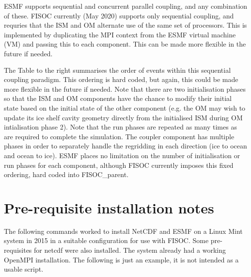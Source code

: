 \documentclass[11pt]{article}
\begin{document}
ESMF supports sequential and concurrent parallel coupling, and any combination of these. 
FISOC currently (May 2020) supports only sequential coupling, and requries that
the ISM and OM alternate use of the same set of processors.
This is implemented by duplicating the MPI context from the ESMF virtual machine (VM)
and passing this to each component. 
This can be made more flexible in the future if needed. 

The Table to the right summarises the order of events within this sequential coupling paradigm.
This ordering is hard coded, but again, this could be made more flexible in the future
if needed.
Note that there are two initialisation phases so that the ISM and OM components have the chance
to modify their initial state based on the initial state of the other component
(e.g. the OM may wish to update its ice shelf cavity geometry directly from the initialised
ISM during OM intialisation phase 2).
Note that the run phases are repeated as many times as are required to complete the simulation.
The coupler component  has multiple phases in order to separately handle
the regridding in each direction (ice to ocean and ocean to ice).
ESMF places no limitation on the number of initialisation or run phases for each component,
although FISOC currently imposes this fixed ordering, hard coded into FISOC\_parent.




\clearpage

\appendix

\section{Pre-requisite installation notes}
\label{app:A}
The following commands worked to install NetCDF and ESMF on a Linux Mint system in 2015 
in a suitable configuration for use with FISOC. 
Some pre-requisites for netcdf were also installed.
The system already had a working OpenMPI installation.
The following is just an example, it is not intended as a usable script. 
\end{document}
